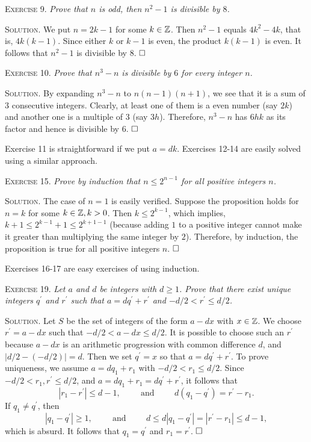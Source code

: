 \documentclass[11pt, leqno]{article}
\newcommand{\done}{\ensuremath{\hfill\square}}
\begin{document}
\textsc{Exercise 9}. \emph{Prove that $n$ is odd, then $n^2-1$ is divisible by $8$.}

\textsc{Solution}. We put $n=2k-1$ for some $k\in\mathbb{Z}$. Then $n^2-1$ equals $4k^2-4k$, that is, $4k(k-1)$. Since either $k$ or $k-1$ is even, the product $k(k-1)$ is even. It follows that $n^2-1$ is divisible by $8$. \done

\textsc{Exercise 10}. \emph{Prove that $n^3-n$ is divisible by $6$ for every integer $n$.}

\textsc{Solution}. By expanding $n^3-n$ to $n(n-1)(n+1)$, we see that it is a sum of $3$ consecutive integers. Clearly, at least one of them is a even number (say $2k$) and another one is a multiple of $3$ (say $3h$). Therefore, $n^3-n$ has $6hk$ as its factor and hence is divisible by $6$. \done

Exercise 11 is straightforward if we put $a=dk$. Exercises 12-14 are easily solved using a similar approach. 

\textsc{Exercise 15}. \emph{Prove by induction that $n\leq 2^{n-1}$ for all positive integers $n$.}

\textsc{Solution}. The case of $n=1$ is easily verified. Suppose the proposition holds for $n=k$ for some $k\in\mathbb{Z}, k>0$. Then $k \leq 2^{k-1}$, which implies, $k+1 \leq 2^{k-1}+1 \leq 2^{k+1-1}$ (because adding $1$ to a positive integer cannot make it greater than multiplying the same integer by $2$). Therefore, by induction, the proposition is true for all positive integers $n$. \done

Exercises 16-17 are easy exercises of using induction.

\textsc{Exercise 19}. \emph{Let $a$ and $d$ be integers with $d\geq 1$. Prove that there exist unique integers $q^{\prime}$ and $r^{\prime}$ such that $a=dq^{\prime} + r^{\prime}$ and $-d/2 < r^{\prime} \leq d/2$.}

\textsc{Solution}. Let $S$ be the set of integers of the form $a-dx$ with $x\in\mathbb{Z}$. We choose $r^{\prime} = a-dx$ such that $-d/2 < a-dx \leq d/2$. It is possible to choose such an $r^{\prime}$ because $a-dx$ is an arithmetic progression with common difference $d$, and $|d/2 - (-d/2)| = d$. Then we set $q^{\prime} = x$ so that $a = dq^{\prime} + r^{\prime}$. To prove uniqueness, we assume $a = dq_1 + r_1$ with $-d/2 < r_1 \leq d/2$. Since $-d/2 < r_1, r^{\prime} \leq d/2$, and $a = dq_1+r_1 = dq^{\prime} + r^{\prime}$, it follows that 
\begin{displaymath}
|r_1 - r^{\prime}| \leq d-1, \hspace{1cm} \text{and} \hspace{1cm} d(q_1-q^{\prime}) = r^{\prime} - r_1.
\end{displaymath}
If $q_1 \ne q^{\prime}$, then 
\begin{displaymath}
|q_1 - q^{\prime}| \geq 1, \hspace{1cm} \text{and} \hspace{1cm} d\leq d|q_1-q^{\prime}| = |r^{\prime} - r_1 | \leq d-1,
\end{displaymath}
which is absurd. It follows that $q_1 = q^{\prime}$ and $r_1 = r^{\prime}$. \done
\end{document}
